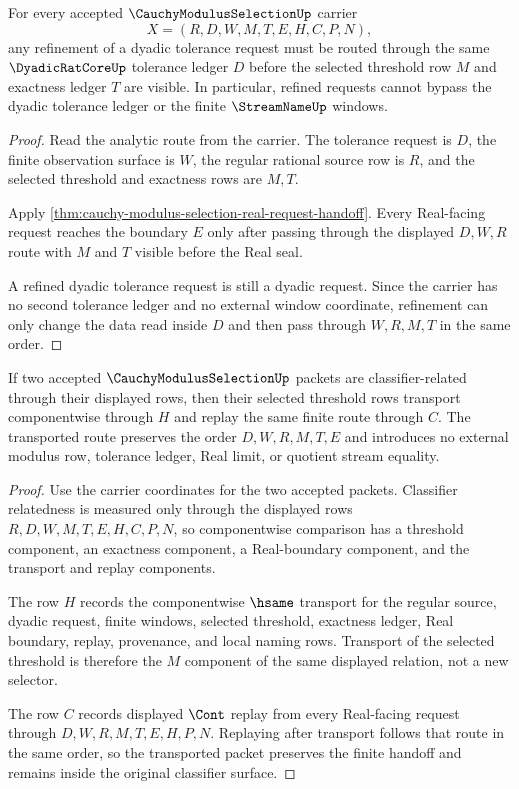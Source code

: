 \begin{theorem}
\label{thm:cauchy-modulus-selection-dyadic-monotonicity}
For every accepted $\CauchyModulusSelectionUp$ carrier
$$
X=(R,D,W,M,T,E,H,C,P,N),
$$
any refinement of a dyadic tolerance request must be routed through the same $\DyadicRatCoreUp$ tolerance ledger $D$ before the selected threshold row $M$ and exactness ledger $T$ are visible. In particular, refined requests cannot bypass the dyadic tolerance ledger or the finite $\StreamNameUp$ windows.
\end{theorem}
\begin{proof}
Read the analytic route from the carrier. The tolerance request is $D$, the finite observation surface is $W$, the regular rational source row is $R$, and the selected threshold and exactness rows are $M,T$.

Apply \autoref{thm:cauchy-modulus-selection-real-request-handoff}. Every Real-facing request reaches the boundary $E$ only after passing through the displayed $D,W,R$ route with $M$ and $T$ visible before the Real seal.

A refined dyadic tolerance request is still a dyadic request. Since the carrier has no second tolerance ledger and no external window coordinate, refinement can only change the data read inside $D$ and then pass through $W,R,M,T$ in the same order.
\end{proof}

\begin{theorem}
\label{thm:cauchy-modulus-selection-transport-closure}
If two accepted $\CauchyModulusSelectionUp$ packets are classifier-related through their displayed rows, then their selected threshold rows transport componentwise through $H$ and replay the same finite route through $C$. The transported route preserves the order $D,W,R,M,T,E$ and introduces no external modulus row, tolerance ledger, Real limit, or quotient stream equality.
\end{theorem}
\begin{proof}
Use the carrier coordinates for the two accepted packets. Classifier relatedness is measured only through the displayed rows $R,D,W,M,T,E,H,C,P,N$, so componentwise comparison has a threshold component, an exactness component, a Real-boundary component, and the transport and replay components.

The row $H$ records the componentwise $\hsame$ transport for the regular source, dyadic request, finite windows, selected threshold, exactness ledger, Real boundary, replay, provenance, and local naming rows. Transport of the selected threshold is therefore the $M$ component of the same displayed relation, not a new selector.

The row $C$ records displayed $\Cont$ replay from every Real-facing request through $D,W,R,M,T,E,H,P,N$. Replaying after transport follows that route in the same order, so the transported packet preserves the finite handoff and remains inside the original classifier surface.
\end{proof}

